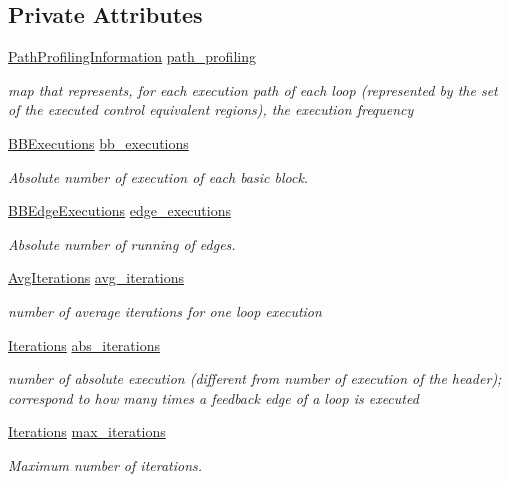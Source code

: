 \subsection*{Private Attributes}
\begin{DoxyCompactItemize}
\item 
\hyperlink{classPathProfilingInformation}{Path\+Profiling\+Information} \hyperlink{classProfilingInformation_abd736acb393bcda5cf8afa13b1a08bb3}{path\+\_\+profiling}
\begin{DoxyCompactList}\small\item\em map that represents, for each execution path of each loop (represented by the set of the executed control equivalent regions), the execution frequency \end{DoxyCompactList}\item 
\hyperlink{classBBExecutions}{B\+B\+Executions} \hyperlink{classProfilingInformation_ab7533fd1f99a3614f64fa4689f8cb6b0}{bb\+\_\+executions}
\begin{DoxyCompactList}\small\item\em Absolute number of execution of each basic block. \end{DoxyCompactList}\item 
\hyperlink{classBBEdgeExecutions}{B\+B\+Edge\+Executions} \hyperlink{classProfilingInformation_a2603735372ee4e804d0585a0a309289e}{edge\+\_\+executions}
\begin{DoxyCompactList}\small\item\em Absolute number of running of edges. \end{DoxyCompactList}\item 
\hyperlink{classAvgIterations}{Avg\+Iterations} \hyperlink{classProfilingInformation_a17172675a0452f39d0df2617044c61a0}{avg\+\_\+iterations}
\begin{DoxyCompactList}\small\item\em number of average iterations for one loop execution \end{DoxyCompactList}\item 
\hyperlink{classIterations}{Iterations} \hyperlink{classProfilingInformation_a2a82038a4cff894193ec76e25fc50633}{abs\+\_\+iterations}
\begin{DoxyCompactList}\small\item\em number of absolute execution (different from number of execution of the header); correspond to how many times a feedback edge of a loop is executed \end{DoxyCompactList}\item 
\hyperlink{classIterations}{Iterations} \hyperlink{classProfilingInformation_adebc384d89658038b8df65b1558b09e5}{max\+\_\+iterations}
\begin{DoxyCompactList}\small\item\em Maximum number of iterations. \end{DoxyCompactList}\end{DoxyCompactItemize}
